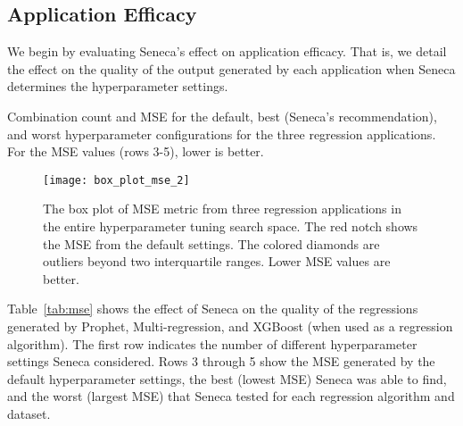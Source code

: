 

\subsection{Application Efficacy}

We begin by evaluating Seneca's effect on application efficacy.
That is, we detail the effect on the quality of the output generated by each
application when Seneca determines the hyperparameter settings. 

\begin{table}
\centering

\caption{Combination count and MSE for the default, best (Seneca's recommendation), and worst hyperparameter configurations for the three regression applications. 
For the MSE  values (rows 3-5), lower is better.
\label{tab:mse}}
\end{table}

\begin{figure}[t] \centering 
\vspace{-0.2in}
\texttt{[image: box\_plot\_mse\_2]}
\vspace{-0.4in}
\caption{The box plot of MSE metric from three regression applications in the entire hyperparameter tuning search space. The red notch shows the MSE from the default settings. The colored diamonds are outliers beyond two interquartile ranges. Lower MSE values are better.
\label{fig:box_plot_mse}}
\vspace{-0.2in}
\end{figure}

Table~\ref{tab:mse} shows the effect of Seneca on the quality of the
regressions generated by Prophet, Multi-regression, and XGBoost (when used as
a regression algorithm). The first row indicates the number of
different hyperparameter settings Seneca considered.  Rows 3 through 5 show
the MSE generated by the default hyperparameter settings, the best (lowest
MSE) Seneca was able to find, and the worst (largest MSE) that Seneca tested
for each regression algorithm and dataset.

